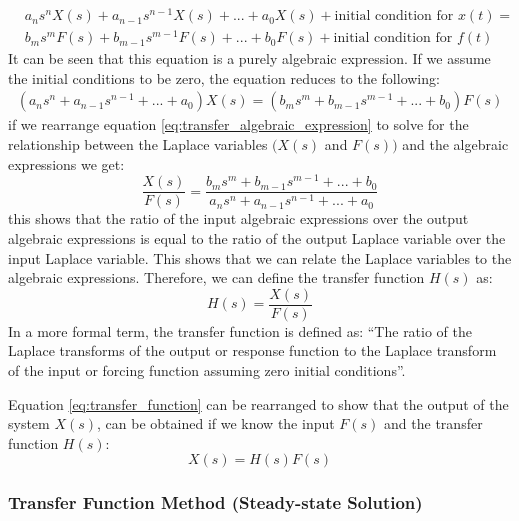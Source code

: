 \documentclass[12pt,letter]{article}
\begin{document}
\begin{eqnarray}
&a_ns^nX(s) + a_{n-1}s^{n-1}X(s) + ... + a_0X(s) + \text{initial condition for } x(t) =   \\
&b_ms^mF(s) + b_{m-1}s^{m-1}F(s) + ... + b_0F(s) + \text{initial condition for } f(t)  \nonumber
\end{eqnarray}
It can be seen that this equation is a purely algebraic expression. If we assume the initial conditions to be zero, the equation reduces to the following:
\begin{eqnarray}
(a_ns^n + a_{n-1}s^{n-1} + ... + a_0)X(s) =  (b_ms^m + b_{m-1}s^{m-1} + ... + b_0)F(s) 
\label{eq:transfer_algebraic_expression}
\end{eqnarray}
if we rearrange equation \ref{eq:transfer_algebraic_expression} to solve for the relationship between the Laplace variables $\big( X(s)$ and $F(s) \big)$ and the algebraic expressions we get:
\begin{equation}
\frac{X(s)}{F(s)} = \frac{b_ms^m + b_{m-1}s^{m-1} + ... + b_0}{a_ns^n + a_{n-1}s^{n-1} + ... + a_0}
\end{equation}
this shows that the ratio of the input algebraic expressions over the output algebraic expressions is equal to the ratio of the output Laplace variable over the input Laplace variable. This shows that we can relate the Laplace variables to the algebraic expressions. Therefore, we can define the transfer function $H(s)$ as: 
\begin{equation}
H(s) = \frac{X(s)}{F(s)}
\label{eq:transfer_function}
\end{equation}
In a more formal term, the transfer function is defined as: ``The ratio of the Laplace transforms of the output or response function to the Laplace transform of the input or forcing function assuming zero initial conditions''.

Equation \ref{eq:transfer_function} can be rearranged to show that the output of the system $X(s)$, can be obtained if we know the input $F(s)$ and the transfer function $H(s)$:
\begin{equation}
X(s) = H(s)F(s)
\end{equation}	


\subsubsection{Transfer Function Method (Steady-state Solution)}
\end{document}

